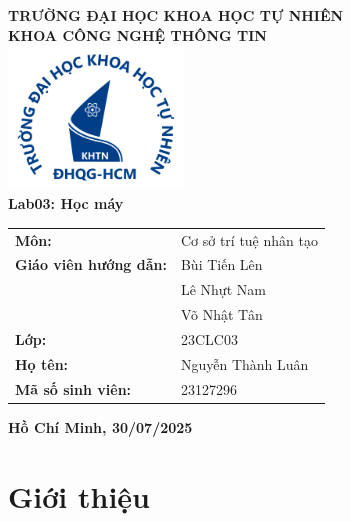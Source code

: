 \documentclass[12pt, a4paper]{article}
\begin{document}
\begin{titlepage}
    \centering
    \fontsize{16pt}{18pt}\selectfont
    \textbf{TRƯỜNG ĐẠI HỌC KHOA HỌC TỰ NHIÊN} \\
    \textbf{KHOA CÔNG NGHỆ THÔNG TIN} \\[1cm]

    \includegraphics[width=0.35\textwidth]{logohcmus.png} \\[1cm]

    {\fontsize{24pt}{26pt}\selectfont \textbf{Lab03: Học máy}} \\[1cm]

    \vspace{0.5cm}

    \begin{center}
        \renewcommand{\arraystretch}{1.2}
        \begin{tabular}{@{}ll}
            \textbf{Môn:} & Cơ sở trí tuệ nhân tạo \\[13pt]
            \textbf{Giáo viên hướng dẫn:} & Bùi Tiến Lên \\ 
                                          & Lê Nhựt Nam \\
                                          & Võ Nhật Tân\\[13pt]
            \textbf{Lớp:} & 23CLC03 \\[13pt]
            \textbf{Họ tên:} & Nguyễn Thành Luân \\[13pt]
            \textbf{Mã số sinh viên:} & 23127296 \\[13pt]
        \end{tabular}
    \end{center}

    \vfill

    {\Large \textbf{Hồ Chí Minh, 30/07/2025}}

\end{titlepage}


\tableofcontents  
\newpage         


\section{Giới thiệu}
\end{document}
